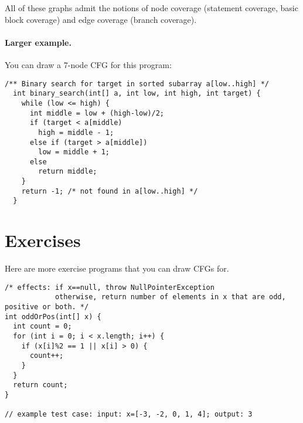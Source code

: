 \documentclass[11pt]{article}
\begin{document}
All of these graphs admit the notions of node coverage (statement
coverage, basic block coverage) and edge coverage (branch coverage).

\paragraph{Larger example.} You can draw a 7-node CFG for this program:

\begin{lstlisting}[basicstyle=\scriptsize\ttfamily]
  /** Binary search for target in sorted subarray a[low..high] */
  int binary_search(int[] a, int low, int high, int target) {
    while (low <= high) {
      int middle = low + (high-low)/2;
      if (target < a[middle)
        high = middle - 1;
      else if (target > a[middle])
        low = middle + 1;
      else
        return middle;
    }
    return -1; /* not found in a[low..high] */
  }
\end{lstlisting}

\vspace*{-2em}
\begin{center}
\end{center}

\newpage
\section*{Exercises}
Here are more exercise programs that you can draw CFGs for.
\begin{lstlisting}[basicstyle=\scriptsize\ttfamily]
/* effects: if x==null, throw NullPointerException
            otherwise, return number of elements in x that are odd, positive or both. */
int oddOrPos(int[] x) {
  int count = 0;
  for (int i = 0; i < x.length; i++) {
    if (x[i]%2 == 1 || x[i] > 0) {
      count++;
    }
  }
  return count;
}

// example test case: input: x=[-3, -2, 0, 1, 4]; output: 3  
\end{lstlisting}
\end{document}
